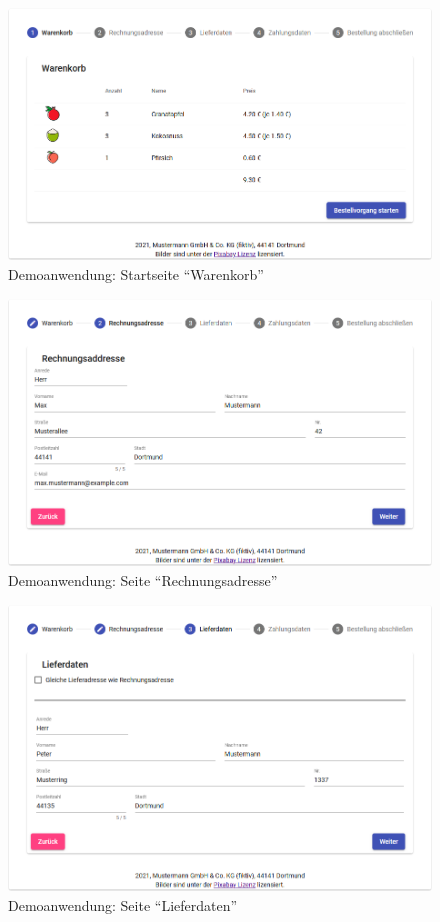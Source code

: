 \begin{figure}[H]
	\centering
	\includegraphics[width=0.75\linewidth]{img/04_erstellung-poc/demoanwendung_vorstellung_01-warenkorb.png}
	\caption{Demoanwendung: Startseite \enquote{Warenkorb}}
	\label{fig:demoanwendung_vorstellung_01-warenkorb}
\end{figure}

\begin{figure}[H]
	\centering
	\includegraphics[width=0.75\linewidth]{img/04_erstellung-poc/demoanwendung_vorstellung_02-rechnungsadresse.png}
	\caption{Demoanwendung: Seite \enquote{Rechnungsadresse}}
	\label{fig:demoanwendung_vorstellung_02-rechnungsadresse}
\end{figure}

\begin{figure}[H]
	\centering
	\includegraphics[width=0.75\linewidth]{img/04_erstellung-poc/demoanwendung_vorstellung_03-lieferdaten.png}
	\caption{Demoanwendung: Seite \enquote{Lieferdaten}}
	\label{fig:demoanwendung_vorstellung_03-lieferdaten}
\end{figure}

